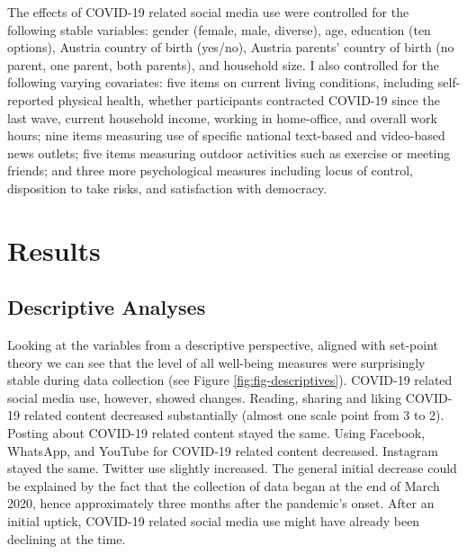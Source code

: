 \documentclass[
  man,floatsintext]{apa7}
\begin{document}
The effects of COVID-19 related social media use were controlled for the following stable variables:
gender (female, male, diverse), age, education (ten options), Austria country of birth (yes/no), Austria parents' country of birth (no parent, one parent, both parents), and household size.
I also controlled for the following varying covariates: five items on current living conditions, including self-reported physical health, whether participants contracted COVID-19 since the last wave, current household income, working in home-office, and overall work hours; nine items measuring use of specific national text-based and video-based news outlets; five items measuring outdoor activities such as exercise or meeting friends; and three more psychological measures including locus of control, disposition to take risks, and satisfaction with democracy.

\hypertarget{results}{%
\section{Results}\label{results}}

\hypertarget{descriptive-analyses}{%
\subsection{Descriptive Analyses}\label{descriptive-analyses}}

Looking at the variables from a descriptive perspective, aligned with set-point theory we can see that the level of all well-being measures were surprisingly stable during data collection (see Figure \ref{fig:fig-descriptives}).
COVID-19 related social media use, however, showed changes.
Reading, sharing and liking COVID-19 related content decreased substantially (almost one scale point from 3 to 2).
Posting about COVID-19 related content stayed the same.
Using Facebook, WhatsApp, and YouTube for COVID-19 related content decreased.
Instagram stayed the same.
Twitter use slightly increased.
The general initial decrease could be explained by the fact that the collection of data began at the end of March 2020, hence approximately three months after the pandemic's onset.
After an initial uptick, COVID-19 related social media use might have already been declining at the time.
\end{document}

